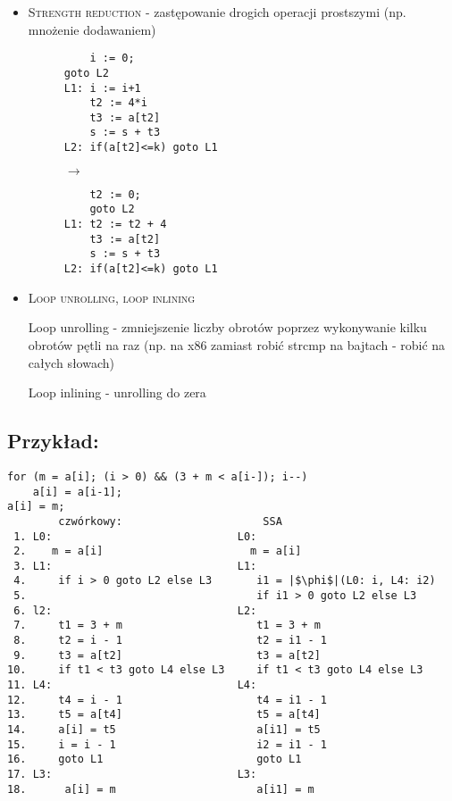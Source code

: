 \begin{itemize}
\item \textsc{Strength reduction} - zastępowanie drogich operacji prostszymi (np. mnożenie dodawaniem)

\begin{figure}[H]
 \begin{minipage}{0.15\textwidth}
  \centering
  \begin{verbatim}
    i := 0;
goto L2
L1: i := i+1
    t2 := 4*i
    t3 := a[t2]
    s := s + t3
L2: if(a[t2]<=k) goto L1

  \end{verbatim}
 \end{minipage}
 \begin{minipage}{0.04\textwidth}
 $\rightarrow$
 \end{minipage}
 \begin{minipage}{0.2\textwidth}
  \centering
  \begin{verbatim}
    t2 := 0;
    goto L2
L1: t2 := t2 + 4 
    t3 := a[t2]
    s := s + t3
L2: if(a[t2]<=k) goto L1

  \end{verbatim}
 \end{minipage}
\end{figure}

\item \textsc{Loop unrolling, loop inlining}

Loop unrolling - zmniejszenie liczby obrotów poprzez wykonywanie kilku obrotów pętli na raz (np. na x86 zamiast robić strcmp na bajtach - robić na całych słowach)

Loop inlining - unrolling do zera

\end{itemize}

\subsection{Przykład:}


\begin{verbatim}
for (m = a[i]; (i > 0) && (3 + m < a[i-]); i--)
    a[i] = a[i-1];
a[i] = m;
        czwórkowy:                      SSA
 1. L0:                             L0:
 2.    m = a[i]                       m = a[i]
 3. L1:                             L1:
 4.     if i > 0 goto L2 else L3       i1 = |$\phi$|(L0: i, L4: i2)
 5.                                    if i1 > 0 goto L2 else L3
 6. l2:                             L2:
 7.     t1 = 3 + m                     t1 = 3 + m
 8.     t2 = i - 1                     t2 = i1 - 1
 9.     t3 = a[t2]                     t3 = a[t2]
10.     if t1 < t3 goto L4 else L3     if t1 < t3 goto L4 else L3
11. L4:                             L4:
12.     t4 = i - 1                     t4 = i1 - 1
13.     t5 = a[t4]                     t5 = a[t4]
14.     a[i] = t5                      a[i1] = t5
15.     i = i - 1                      i2 = i1 - 1
16.     goto L1                        goto L1
17. L3:                             L3:
18.      a[i] = m                      a[i1] = m
\end{verbatim}

